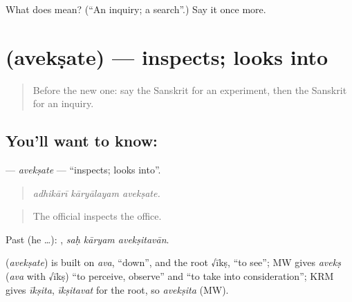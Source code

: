 \begin{tcolorbox}[breakable,colback=teal!4,colframe=teal!35!black,title={Before you move on}]
What does  mean? (\textquotedblleft{}An inquiry; a search\textquotedblright{}.) Say it once more.
\end{tcolorbox}
\section[\texorpdfstring{\sk{अवेक्षते} (avekṣate)}{अवेक्षते (avekṣate)}]{ (avekṣate) — inspects; looks into}

\label{lesson:SA-C362-aveksate}



\begin{quote}
Before the new one: say the Sanskrit for an experiment, then the Sanskrit for an inquiry.
\end{quote}

\subsection*{You'll want to know: }
\textbf{} — \emph{avekṣate} — \textquotedblleft{}inspects; looks into\textquotedblright{}.

\begin{quote}
  
\end{quote}

\begin{quote}
\emph{adhikārī kāryālayam avekṣate.}
\end{quote}

\begin{quote}
The official inspects the office.
\end{quote}

Past (he …):   , \emph{saḥ kāryam avekṣitavān}.

\begin{cousinweb}
\textbf{} (\emph{avekṣate}) is built on \emph{ava}, \textquotedblleft{}down\textquotedblright{}, and the root √īkṣ, \textquotedblleft{}to see\textquotedblright{}; MW gives \emph{avekṣ} (\emph{ava} with √īkṣ) \textquotedblleft{}to perceive, observe\textquotedblright{} and \textquotedblleft{}to take into consideration\textquotedblright{}; KRM gives \emph{īkṣita}, \emph{īkṣitavat} for the root, so \emph{avekṣita} (MW).
\end{cousinweb}

